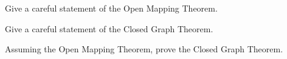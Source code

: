 \begin{alist}
\item Give a careful statement of the Open Mapping Theorem.
\item Give a careful statement of the Closed Graph Theorem.
\item Assuming the Open Mapping Theorem, prove the Closed Graph
Theorem.
\end{alist}
